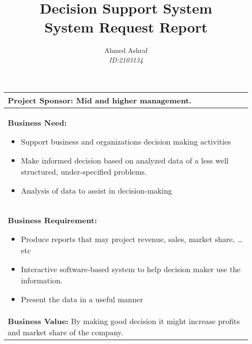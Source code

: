 \documentclass[12pt]{article}
\title{Decision Support System \\ System Request Report}
\author{Ahmed Ashraf \\ \textit{ID:2103134}}
\date{}
\begin{document}
\maketitle
\begin{tabular}{p{}}
    \toprule
    \textbf{Project Sponsor:} Mid and higher management.                                                        \\
    \midrule
    \textbf{Business Need:}
    \begin{itemize}
        \item{Support business and organizations decision making activities}
        \item{Make informed decision based on analyzed data of a less well structured, under-specified problems.}
        \item{Analysis of data to assist in decision-making}
    \end{itemize}    \\
    \midrule
    \textbf{Business Requirement:}
    \begin{itemize}
        \item Produce reports that may project revenue, sales, market share, \ldots etc
        \item Interactive software-based system to help decision maker use the information.
        \item Present the data in a useful manner
    \end{itemize}                          \\
    \midrule
    \textbf{Business Value:} By making good decision it might increase profits and market share of the company. \\
    \midrule
\end{tabular}
\end{document}
